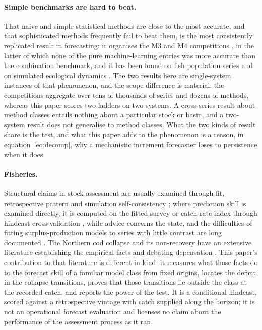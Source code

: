 \paragraph{Simple benchmarks are hard to beat.} That naive and simple statistical methods are close to the most accurate, and that sophisticated methods frequently fail to beat them, is the most consistently replicated result in forecasting: it organises the M3 and M4 competitions \citep{Makridakis2000,Makridakis2018}, in the latter of which none of the pure machine-learning entries was more accurate than the combination benchmark, and it has been found on fish population series \citep{Ward2014} and on simulated ecological dynamics \citep{Perretti2013}. The two results here are single-system instances of that phenomenon, and the scope difference is material: the competitions aggregate over tens of thousands of series and dozens of methods, whereas this paper scores two ladders on two systems. A cross-series result about method classes entails nothing about a particular stock or basin, and a two-system result does not generalise to method classes. What the two kinds of result share is the test, and what this paper adds to the phenomenon is a reason, in equation~\eqref{eq:decomp}, why a mechanistic increment forecaster loses to persistence when it does.

\paragraph{Fisheries.} Structural claims in stock assessment are usually examined through fit, retrospective pattern and simulation self-consistency \citep{HilbornWalters1992,Punt2016,Maunder2015}; where prediction skill is examined directly, it is computed on the fitted survey or catch-rate index through hindcast cross-validation \citep{Kell2016,Kell2021,Carvalho2021,Kokkalis2024}, while advice concerns the state, and the difficulties of fitting surplus-production models to series with little contrast are long documented \citep{HilbornWalters1992,LudwigWalters1985,Polacheck1993,Punt2003,PedersenBerg2017}. The Northern cod collapse and its non-recovery have an extensive literature establishing the empirical facts \citep{Hutchings1994,Myers1997,Walters1996,Hutchings2005,RoseRowe2015,RoseWalters2019,Rose2026} and debating depensation \citep{Shelton1999,Hutchings1996,Myers1995,Liermann1997}. This paper's contribution to that literature is different in kind: it measures what those facts do to the forecast skill of a familiar model class from fixed origins, locates the deficit in the collapse transitions, proves that those transitions lie outside the class at the recorded catch, and reports the power of the test. It is a conditional hindcast, scored against a retrospective vintage with catch supplied along the horizon; it is not an operational forecast evaluation and licenses no claim about the performance of the assessment process as it ran.

